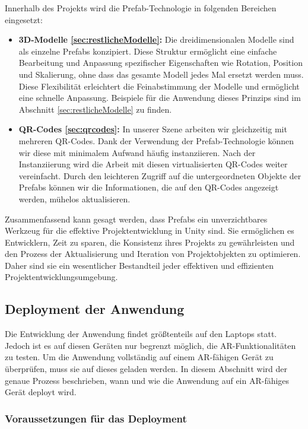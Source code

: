 Innerhalb des Projekts wird die Prefab-Technologie in folgenden Bereichen eingesetzt:
\begin{itemize}
    \item \textbf{3D-Modelle \ref{sec:restlicheModelle}:} Die dreidimensionalen Modelle sind als einzelne Prefabs konzipiert. Diese Struktur ermöglicht eine einfache Bearbeitung und Anpassung spezifischer Eigenschaften wie Rotation, Position und Skalierung, ohne dass das gesamte Modell jedes Mal ersetzt werden muss. Diese Flexibilität erleichtert die Feinabstimmung der Modelle und ermöglicht eine schnelle Anpassung. Beispiele für die Anwendung dieses Prinzips sind im Abschnitt \ref{sec:restlicheModelle} zu finden.
    \item \textbf{QR-Codes \ref{sec:qrcodes}:} In unserer Szene arbeiten wir gleichzeitig mit mehreren QR-Codes. Dank der Verwendung der Prefab-Technologie können wir diese mit minimalem Aufwand häufig instanziieren. Nach der Instanziierung wird die Arbeit mit diesen virtualisierten QR-Codes weiter vereinfacht. Durch den leichteren Zugriff auf die untergeordneten Objekte der Prefabs können wir die Informationen, die auf den QR-Codes angezeigt werden, mühelos aktualisieren.
\end{itemize}

Zusammenfassend kann gesagt werden, dass Prefabs ein unverzichtbares Werkzeug für die effektive Projektentwicklung in Unity sind. Sie ermöglichen es Entwicklern, Zeit zu sparen, die Konsistenz ihres Projekts zu gewährleisten und den Prozess der Aktualisierung und Iteration von Projektobjekten zu optimieren. Daher sind sie ein wesentlicher Bestandteil jeder effektiven und effizienten Projektentwicklungsumgebung.


\subsection{Deployment der Anwendung}

Die Entwicklung der Anwendung findet größtenteils auf den Laptops statt. Jedoch ist es auf diesen Geräten nur begrenzt möglich, die AR-Funktionalitäten zu testen. Um die Anwendung vollständig auf einem AR-fähigen Gerät zu überprüfen, muss sie auf dieses geladen werden. In diesem Abschnitt wird der genaue Prozess beschrieben, wann und wie die Anwendung auf ein AR-fähiges Gerät deployt wird.

\subsubsection{Voraussetzungen für das Deployment}

